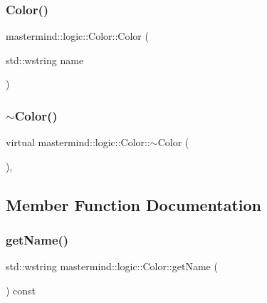 \hypertarget{classmastermind_1_1logic_1_1_color_ac1e72fd3f7927c56259c3bcce1b2b248}{}\label{classmastermind_1_1logic_1_1_color_ac1e72fd3f7927c56259c3bcce1b2b248} 
\subsubsection{\texorpdfstring{Color()}{Color()}\hspace{0.1cm}{\footnotesize\ttfamily [2/2]}}
{\footnotesize\ttfamily mastermind\+::logic\+::\+Color\+::\+Color (\begin{DoxyParamCaption}\item[{std\+::wstring}]{name }\end{DoxyParamCaption})}

\hypertarget{classmastermind_1_1logic_1_1_color_ab8ea1579c6a52d47a0dfeb7eb524e147}{}\label{classmastermind_1_1logic_1_1_color_ab8ea1579c6a52d47a0dfeb7eb524e147} 
\subsubsection{\texorpdfstring{$\sim$\+Color()}{~Color()}}
{\footnotesize\ttfamily virtual mastermind\+::logic\+::\+Color\+::$\sim$\+Color (\begin{DoxyParamCaption}{ }\end{DoxyParamCaption})\hspace{0.3cm}{\ttfamily [inline]}, {\ttfamily [virtual]}}



\subsection{Member Function Documentation}
\hypertarget{classmastermind_1_1logic_1_1_color_a4a591bc7e973ba8a224d63d32929daf1}{}\label{classmastermind_1_1logic_1_1_color_a4a591bc7e973ba8a224d63d32929daf1} 
\subsubsection{\texorpdfstring{get\+Name()}{getName()}}
{\footnotesize\ttfamily std\+::wstring mastermind\+::logic\+::\+Color\+::get\+Name (\begin{DoxyParamCaption}{ }\end{DoxyParamCaption}) const}



